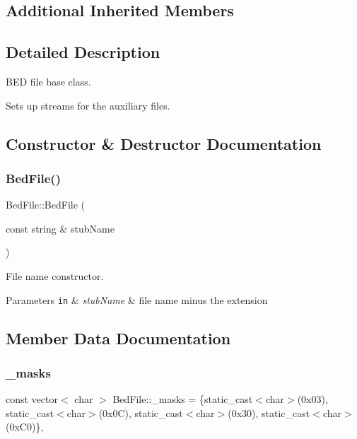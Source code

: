 \subsection*{Additional Inherited Members}


\subsection{Detailed Description}
B\+ED file base class. 

Sets up streams for the auxiliary files. 

\subsection{Constructor \& Destructor Documentation}
\mbox{\label{classsamp_files_1_1_bed_file_a69631d96080c22e686e8acb75cf2cc89}} 
\subsubsection{\texorpdfstring{Bed\+File()}{BedFile()}}
{\footnotesize\ttfamily Bed\+File\+::\+Bed\+File (\begin{DoxyParamCaption}\item[{const string \&}]{stub\+Name }\end{DoxyParamCaption})}



File name constructor. 


\begin{DoxyParams}[1]{Parameters}
\mbox{\tt in}  & {\em stub\+Name} & file name minus the extension \\
\hline
\end{DoxyParams}


\subsection{Member Data Documentation}
\mbox{\label{classsamp_files_1_1_bed_file_a26fc3857dd112e96e626da1a48b026bc}} 
\subsubsection{\texorpdfstring{\+\_\+masks}{\_masks}}
{\footnotesize\ttfamily const vector$<$ char $>$ Bed\+File\+::\+\_\+masks = \{static\+\_\+cast$<$char$>$(0x03), static\+\_\+cast$<$char$>$(0x0\+C), static\+\_\+cast$<$char$>$(0x30), static\+\_\+cast$<$char$>$(0x\+C0)\}\hspace{0.3cm}{\ttfamily [static]}, {\ttfamily [protected]}}



